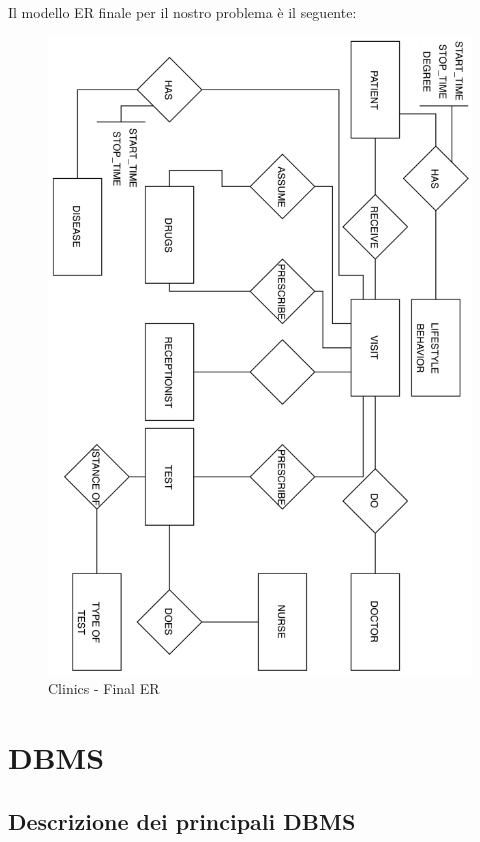 \newpage
Il modello ER finale per il nostro problema è il seguente: 

\begin{center}
\begin{figure}[H]
\centering
\includegraphics[scale=0.8]{figures/clinics_finalER.png}
\caption{Clinics - Final ER}
\end{figure}
\end{center}


\section{DBMS}

\subsection{Descrizione dei principali DBMS}

